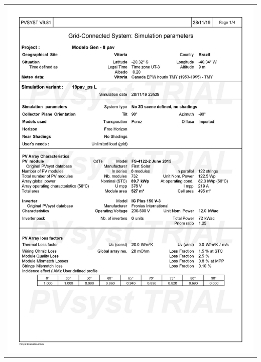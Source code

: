 \begin{table}[H]
    \centering
    \begin{tabular}{l}
        \includegraphics[width=\textwidth]{figures/attachments/resultpv23.jpg}
    \end{tabular}
\end{table}
\pagebreak
